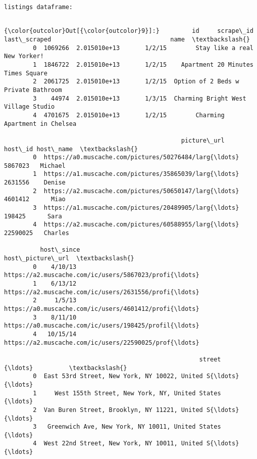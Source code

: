 \documentclass[11pt]{article}
\begin{document}
    \begin{Verbatim}[commandchars=\\\{\}]
listings dataframe: 


    \end{Verbatim}

            \begin{Verbatim}[commandchars=\\\{\}]
{\color{outcolor}Out[{\color{outcolor}9}]:}         id     scrape\_id last\_scraped                                 name  \textbackslash{}
        0  1069266  2.015010e+13       1/2/15        Stay like a real New Yorker!    
        1  1846722  2.015010e+13       1/2/15    Apartment 20 Minutes Times Square   
        2  2061725  2.015010e+13       1/2/15  Option of 2 Beds w Private Bathroom   
        3    44974  2.015010e+13       1/3/15  Charming Bright West Village Studio   
        4  4701675  2.015010e+13       1/2/15        Charming Apartment in Chelsea   
        
                                                 picture\_url   host\_id host\_name  \textbackslash{}
        0  https://a0.muscache.com/pictures/50276484/larg{\ldots}   5867023   Michael   
        1  https://a1.muscache.com/pictures/35865039/larg{\ldots}   2631556    Denise   
        2  https://a2.muscache.com/pictures/50650147/larg{\ldots}   4601412      Miao   
        3  https://a1.muscache.com/pictures/20489905/larg{\ldots}    198425      Sara   
        4  https://a2.muscache.com/pictures/60588955/larg{\ldots}  22590025   Charles   
        
          host\_since                                   host\_picture\_url  \textbackslash{}
        0    4/10/13  https://a2.muscache.com/ic/users/5867023/profi{\ldots}   
        1    6/13/12  https://a2.muscache.com/ic/users/2631556/profi{\ldots}   
        2     1/5/13  https://a0.muscache.com/ic/users/4601412/profi{\ldots}   
        3    8/11/10  https://a0.muscache.com/ic/users/198425/profil{\ldots}   
        4   10/15/14  https://a2.muscache.com/ic/users/22590025/prof{\ldots}   
        
                                                      street        {\ldots}          \textbackslash{}
        0  East 53rd Street, New York, NY 10022, United S{\ldots}        {\ldots}           
        1     West 155th Street, New York, NY, United States        {\ldots}           
        2  Van Buren Street, Brooklyn, NY 11221, United S{\ldots}        {\ldots}           
        3   Greenwich Ave, New York, NY 10011, United States        {\ldots}           
        4  West 22nd Street, New York, NY 10011, United S{\ldots}        {\ldots}           
        

\end{Verbatim}
\end{document}
